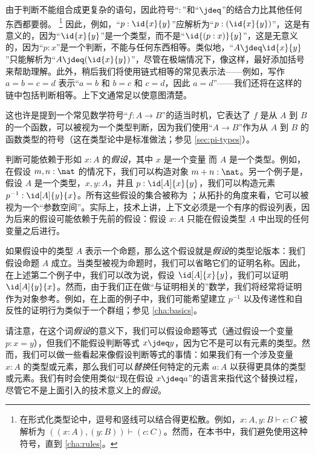 由于判断不能组合成更复杂的语句，因此符号“$:$”和“$\jdeq$”的结合力比其他任何东西都要弱。%
\footnote{在形式化类型论中，逗号和竖线可以结合得更松散。例如，$x:A,y:B\vdash c:C$ 被解析为 $((x:A),(y:B))\vdash (c:C)$。然而，在本书中，我们避免使用这种符号，直到 \cref{cha:rules}。}
因此，例如，“$p:\id{x}{y}$”应解析为“$p:(\id{x}{y})$”，这是有意义的，因为“$\id{x}{y}$”是一个类型，而不是“$\id{(p:x)}{y}$”，这是无意义的，因为“$p:x$”是一个判断，不能与任何东西相等。类似地，“$A\jdeq \id{x}{y}$”只能解析为“$A\jdeq(\id{x}{y})$”，尽管在极端情况下，像这样，最好添加括号来帮助理解。此外，稍后我们将使用链式相等的常见表示法——例如，写作 $a=b=c=d$ 表示“$a=b$ 和 $b=c$ 和 $c=d$，因此 $a=d$”——我们还将在这样的链中包括判断相等。上下文通常足以使意图清楚。

这也许是提到一个常见数学符号“$f:A\to B$”的适当时机，它表达了 $f$ 是从 $A$ 到 $B$ 的一个函数，可以被视为一个类型判断，因为我们使用“$A\to B$”作为从 $A$ 到 $B$ 的函数类型的符号（这在类型论中是标准做法；参见 \cref{sec:pi-types}）。

%
判断可能依赖于形如 $x:A$ 的\emph{假设}，其中 $x$ 是一个变量
%
而 $A$ 是一个类型。例如，在假设 $m,n : \nat$ 的情况下，我们可以构造对象 $m + n : \nat$。另一个例子是，假设 $A$ 是一个类型，$x,y : A$，并且 $p : \id[A]{x}{y}$，我们可以构造元素 $p^{-1} : \id[A]{y}{x}$。所有这些假设的集合被称为 ；从拓扑的角度来看，它可以被视为一个“参数空间”。实际上，技术上讲，上下文必须是一个有序的假设列表，因为后来的假设可能依赖于先前的假设：假设 $x:A$ 只能在假设类型 $A$ 中出现的任何变量之后进行。

如果假设中的类型 $A$ 表示一个命题，那么这个假设就是\emph{假设}的类型论版本：我们假设命题 $A$ 成立。当类型被视为命题时，我们可以省略它们的证明名称。因此，在上述第二个例子中，我们可以改为说，假设 $\id[A]{x}{y}$，我们可以证明 $\id[A]{y}{x}$。然而，由于我们正在做“与证明相关的”数学，我们将经常将证明作为对象参考。例如，在上面的例子中，我们可能希望建立 $p^{-1}$ 以及传递性和自反性的证明行为类似于一个群组；参见 \cref{cha:basics}。

请注意，在这个词\emph{假设}的意义下，我们可以假设命题等式（通过假设一个变量 $p:x=y$），但我们不能假设判断等式 $x\jdeq y$，因为它不是可以有元素的类型。然而，我们可以做一些看起来像假设判断等式的事情：如果我们有一个涉及变量 $x:A$ 的类型或元素，那么我们可以\emph{替换}任何特定的元素 $a:A$ 以获得更具体的类型或元素。我们有时会使用类似“现在假设 $x\jdeq a$”的语言来指代这个替换过程，尽管它不是上面引入的技术意义上的\emph{假设}。%

